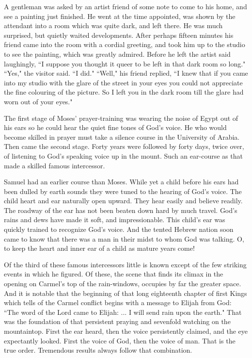 A gentleman was asked by an artist friend of some note to come to his
home, and see a painting just finished. He went at the time appointed, was
shown by the attendant into a room which was quite dark, and left there.
He was much surprised, but quietly waited developments. After perhaps
fifteen minutes his friend came into the room with a cordial greeting, and
took him up to the studio to see the painting, which was greatly admired.
Before he left the artist said laughingly, ``I suppose you thought it queer
to be left in that dark room so long." ``Yes," the visitor said. ``I did."
``Well," his friend replied, ``I knew that if you came into my studio with
the glare of the street in your eyes you could not appreciate the fine
colouring of the picture. So I left you in the dark room till the glare
had worn out of your eyes."

The first stage of Moses' prayer-training was wearing the noise of Egypt
out of his ears so he could hear the quiet fine tones of God's voice. He
who would become skilled in prayer must take a silence course in the
University of Arabia. Then came the second stage. Forty years were
followed by forty days, twice over, of listening to God's speaking voice
up in the mount. Such an ear-course as that made a skilled famous
intercessor.

Samuel had an earlier course than Moses. While yet a child before his ears
had been dulled by earth sounds they were tuned to the hearing of God's
voice. The child heart and ear naturally open upward. They hear easily and
believe readily. The roadway of the ear has not been beaten down hard by
much travel. God's rains and dews have made it soft, and impressionable.
This child's ear was quickly trained to recognize God's voice. And the
tented Hebrew nation soon came to know that there was a man in their midst
to whom God was talking. O, to keep the heart and inner ear of a child as
mature years come!

Of the third of these famous intercessors little is known except of the
few striking events in which he figured. Of these, the scene that finds
its climax in the opening on Carmel's top of the rain-windows, occupies by
far the greater space. And it is notable that the beginning of that long
eighteenth chapter of first Kings which tells of the Carmel conflict
begins with a message to Elijah from God: ``The word of the Lord came to
Elijah: ... I will send rain upon the earth." That was the foundation of
that persistent praying and sevenfold watching on the mountaintop. First
the ear heard, then the voice persistently claimed, and the eye
expectantly looked. First the voice of God, then the voice of man. That is
the true order. Tremendous results always follow that combination.



